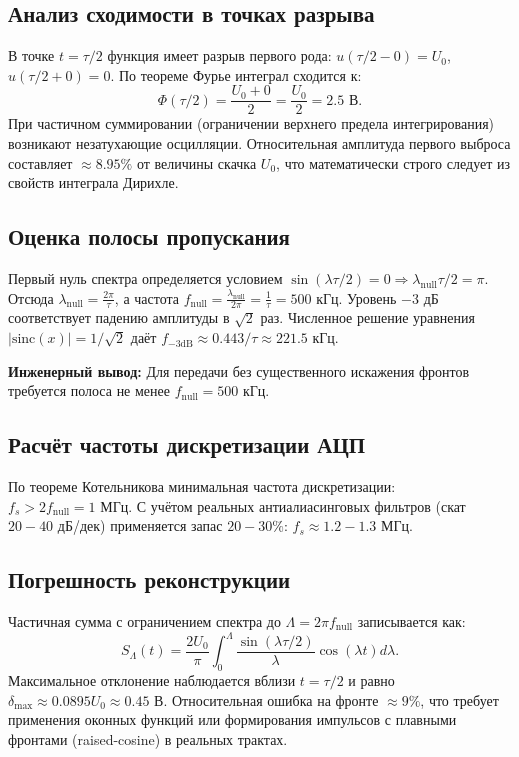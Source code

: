 \documentclass[12pt,a4paper]{article}
\begin{document}
\subsection{Анализ сходимости в точках разрыва}
В точке $t = \tau/2$ функция имеет разрыв первого рода: $u(\tau/2-0) = U_0$, $u(\tau/2+0) = 0$.  
По теореме Фурье интеграл сходится к:
\[
\Phi(\tau/2) = \frac{U_0 + 0}{2} = \frac{U_0}{2} = 2.5 \text{ В}.
\]
При частичном суммировании (ограничении верхнего предела интегрирования) возникают незатухающие осцилляции. Относительная амплитуда первого выброса составляет $\approx 8.95\%$ от величины скачка $U_0$, что математически строго следует из свойств интеграла Дирихле.

\subsection{Оценка полосы пропускания}
Первый нуль спектра определяется условием $\sin(\lambda \tau/2) = 0 \Rightarrow \lambda_{\text{null}} \tau/2 = \pi$.  
Отсюда $\lambda_{\text{null}} = \frac{2\pi}{\tau}$, а частота $f_{\text{null}} = \frac{\lambda_{\text{null}}}{2\pi} = \frac{1}{\tau} = 500 \text{ кГц}$.  
Уровень $-3$ дБ соответствует падению амплитуды в $\sqrt{2}$ раз. Численное решение уравнения $|\text{sinc}(x)| = 1/\sqrt{2}$ даёт $f_{-3\text{dB}} \approx 0.443/\tau \approx 221.5 \text{ кГц}$.  

\begin{applink}
\textbf{Инженерный вывод:} Для передачи без существенного искажения фронтов требуется полоса не менее $f_{\text{null}} = 500$ кГц.
\end{applink}

\subsection{Расчёт частоты дискретизации АЦП}
По теореме Котельникова минимальная частота дискретизации: $f_s > 2 f_{\text{null}} = 1 \text{ МГц}$.  
С учётом реальных антиалиасинговых фильтров (скат $20-40$ дБ/дек) применяется запас $20-30\%$: $f_s \approx 1.2-1.3 \text{ МГц}$.

\subsection{Погрешность реконструкции}
Частичная сумма с ограничением спектра до $\Lambda = 2\pi f_{\text{null}}$ записывается как:
\[
S_\Lambda(t) = \frac{2U_0}{\pi} \int_{0}^{\Lambda} \frac{\sin(\lambda \tau/2)}{\lambda} \cos(\lambda t) d\lambda.
\]
Максимальное отклонение наблюдается вблизи $t = \tau/2$ и равно $\delta_{\max} \approx 0.0895 U_0 \approx 0.45$ В. Относительная ошибка на фронте $\approx 9\%$, что требует применения оконных функций или формирования импульсов с плавными фронтами (raised-cosine) в реальных трактах.
\end{document}
